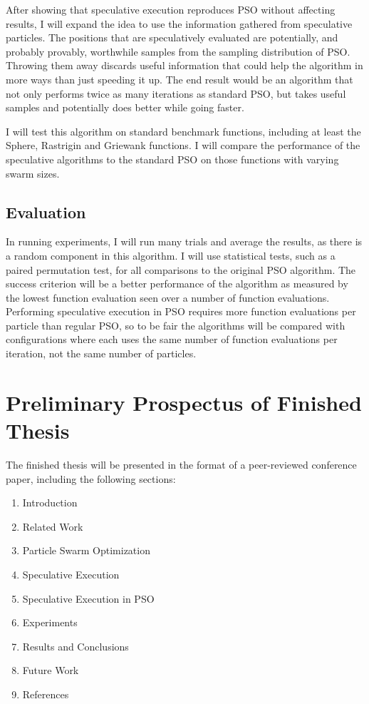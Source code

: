 \documentclass[onecolumn, 12pt]{article}
\begin{document}
After showing that speculative execution reproduces PSO without affecting
results, I will expand the idea to use the information gathered from
speculative particles.  The positions that are speculatively evaluated are
potentially, and probably provably, worthwhile samples from the sampling
distribution of PSO.  Throwing them away discards useful information that could
help the algorithm in more ways than just speeding it up.  The end result would
be an algorithm that not only performs twice as many iterations as standard
PSO, but takes useful samples and potentially does better while going faster.

I will test this algorithm on standard benchmark functions, including at least
the Sphere, Rastrigin and Griewank functions.  I will compare the performance
of the speculative algorithms to the standard PSO on those functions with
varying swarm sizes.

\subsection{Evaluation}

In running experiments, I will run many trials and average the results, as
there is a random component in this algorithm.  I will use statistical tests,
such as a paired permutation test, for all comparisons to the original PSO
algorithm.  The success criterion will be a better performance of the algorithm
as measured by the lowest function evaluation seen over a number of function
evaluations.  Performing speculative execution in PSO requires more function
evaluations per particle than regular PSO, so to be fair the algorithms will be
compared with configurations where each uses the same number of function
evaluations per iteration, not the same number of particles.

\section{Preliminary Prospectus of Finished Thesis}

The finished thesis will be presented in the format of a peer-reviewed
conference paper, including the following sections:

\begin{enumerate}
  \item Introduction
  \item Related Work
  \item Particle Swarm Optimization
  \item Speculative Execution
  \item Speculative Execution in PSO
  \item Experiments
  \item Results and Conclusions
  \item Future Work
  \item References
\end{enumerate}
\end{document}
